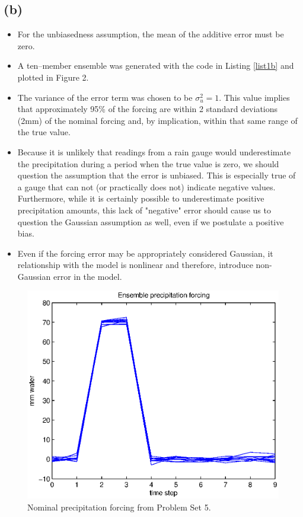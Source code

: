 \documentclass[letterpaper]{tufte-handout}
\begin{document}
  \subsection{(b)}
  \begin{itemize}
    \item For the unbiasedness assumption, the mean of the additive error must be zero.
    \item A ten--member ensemble was generated with the code in Listing \ref{list1b} and plotted in Figure 2. 

    \item The variance of the error term was chosen to be $\sigma^2_u = 1$. This value implies that approximately 95\% of the forcing are within 2 standard deviations (2mm) of the nominal forcing and, by implication, within that same range of the true value. 
    \item Because it is unlikely that readings from a rain gauge would underestimate the precipitation during a period when the true value is zero, we should question the assumption that the error is unbiased.
      This is especially true of a gauge that can not (or practically does not) indicate negative values. Furthermore, while it is certainly possible to underestimate positive precipitation amounts, this lack of "negative" error should cause us to question the Gaussian assumption as well, even if we postulate a positive bias.
    \item Even if the forcing error may be appropriately considered Gaussian, it relationship with the model is nonlinear and therefore, introduce non-Gaussian error in the model.
  \end{itemize}
  {\small
    
  }
  \begin{figure}
    \includegraphics[width=\textwidth]{1b}
    \caption{Nominal precipitation forcing from Problem Set 5.}
    \label{1b}
  \end{figure}
\end{document}
